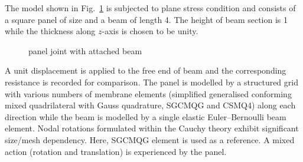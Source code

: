\documentclass[3p,sort&compress,11pt,fleqn]{elsarticle}
\newcommand*{\figref}[1]{Fig.~\ref{#1}}
\begin{document}
The model shown in \figref{fig:joint_example} is subjected to plane stress condition and consists of a square panel of size  and a beam of length \num{4}. The height of beam section is \num{1} while the thickness along $z$-axis is chosen to be unity.
\begin{figure}[htb]
\centering\footnotesize
{}
\caption{panel joint with attached beam}\label{fig:joint_example}
\end{figure}
A unit displacement is applied to the free end of beam and the corresponding resistance is recorded for comparison. The panel is modelled by a structured grid with various numbers of membrane elements (simplified generalised conforming mixed quadrilateral with Gauss quadrature, SGCMQG \citep{Chang2020} and CSMQ4) along each direction while the beam is modelled by a single elastic Euler--Bernoulli beam element. Nodal rotations formulated within the Cauchy theory exhibit significant size/mesh dependency. Here, SGCMQG element is used as a reference. A mixed action (rotation and translation) is experienced by the panel.
\end{document}
